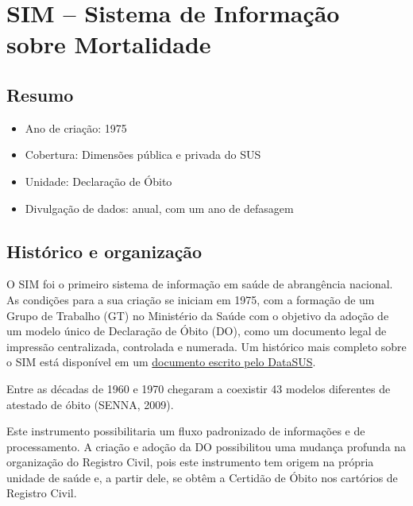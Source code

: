 \documentclass[
  letterpaper,
  DIV=11,
  numbers=noendperiod]{scrreprt}
\providecommand{\tightlist}{%
  \setlength{\itemsep}{0pt}\setlength{\parskip}{0pt}}\usepackage{longtable,booktabs,array}
\begin{document}

\chapter{SIM -- Sistema de Informação sobre
Mortalidade}\label{sim-sistema-de-informauxe7uxe3o-sobre-mortalidade}

\section{Resumo}\label{resumo}

\begin{itemize}
\tightlist
\item
  Ano de criação: 1975
\item
  Cobertura: Dimensões pública e privada do SUS
\item
  Unidade: Declaração de Óbito
\item
  Divulgação de dados: anual, com um ano de defasagem
\end{itemize}

\section{Histórico e
organização}\label{histuxf3rico-e-organizauxe7uxe3o}

O SIM foi o primeiro sistema de informação em saúde de abrangência
nacional. As condições para a sua criação se iniciam em 1975, com a
formação de um Grupo de Trabalho (GT) no Ministério da Saúde com o
objetivo da adoção de um modelo único de Declaração de Óbito (DO), como
um documento legal de impressão centralizada, controlada e numerada. Um
histórico mais completo sobre o SIM está disponível em um
\href{assets/sim/INTRO.pdf}{documento escrito pelo DataSUS}.

\begin{tcolorbox}[enhanced jigsaw, arc=.35mm, bottomrule=.15mm, breakable, opacityback=0, rightrule=.15mm, toprule=.15mm, leftrule=.75mm, colframe=quarto-callout-color-frame, left=2mm, colback=white]

Entre as décadas de 1960 e 1970 chegaram a coexistir 43 modelos
diferentes de atestado de óbito (SENNA, 2009).

\end{tcolorbox}

Este instrumento possibilitaria um fluxo padronizado de informações e de
processamento. A criação e adoção da DO possibilitou uma mudança
profunda na organização do Registro Civil, pois este instrumento tem
origem na própria unidade de saúde e, a partir dele, se obtêm a Certidão
de Óbito nos cartórios de Registro Civil.
\end{document}
